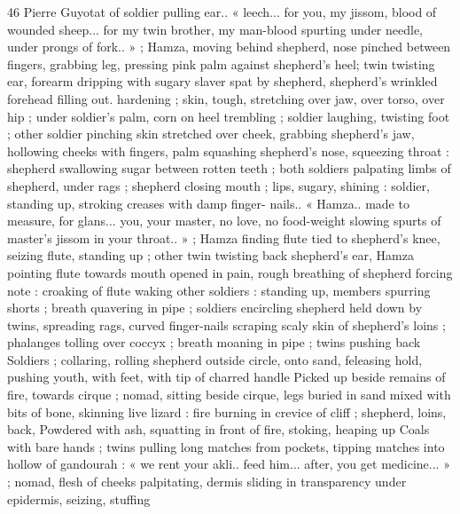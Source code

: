 46 Pierre Guyotat
of soldier pulling ear.. « leech... for you, my jissom, blood of wounded
sheep... for my twin brother, my man-blood spurting under needle,
under prongs of fork.. » ; Hamza, moving behind shepherd, nose
pinched between fingers, grabbing leg, pressing pink palm against
shepherd's heel; twin twisting ear, forearm dripping with sugary
slaver spat by shepherd, shepherd's wrinkled forehead filling out.
hardening ; skin, tough, stretching over jaw, over torso, over hip ;
under soldier's palm, corn on heel trembling ; soldier laughing,
twisting foot ; other soldier pinching skin stretched over cheek,
grabbing shepherd's jaw, hollowing cheeks with fingers, palm
squashing shepherd's nose, squeezing throat : shepherd swallowing
sugar between rotten teeth ; both soldiers palpating limbs of
shepherd, under rags ; shepherd closing mouth ; lips, sugary,
shining : soldier, standing up, stroking creases with damp finger-
nails.. « Hamza.. made to measure, for glans... you, your master, no
love, no food-weight slowing spurts of master’s jissom in your
throat.. » ; Hamza finding flute tied to shepherd's knee, seizing flute,
standing up ; other twin twisting back shepherd's ear, Hamza pointing
flute towards mouth opened in pain, rough breathing of shepherd
forcing note : croaking of flute waking other soldiers : standing up,
members spurring shorts ; breath quavering in pipe ; soldiers
encircling shepherd held down by twins, spreading rags, curved
finger-nails scraping scaly skin of shepherd's loins ; phalanges
tolling over coccyx ; breath moaning in pipe ; twins pushing back
Soldiers ; collaring, rolling shepherd outside circle, onto sand,
feleasing hold, pushing youth, with feet, with tip of charred handle
Picked up beside remains of fire, towards cirque ; nomad, sitting
beside cirque, legs buried in sand mixed with bits of bone, skinning
live lizard : fire burning in crevice of cliff ; shepherd, loins, back,
Powdered with ash, squatting in front of fire, stoking, heaping up
Coals with bare hands ; twins pulling long matches from pockets,
tipping matches into hollow of gandourah : « we rent your akli.. feed
him... after, you get medicine... » ; nomad, flesh of cheeks palpitating,
dermis sliding in transparency under epidermis, seizing, stuffing

